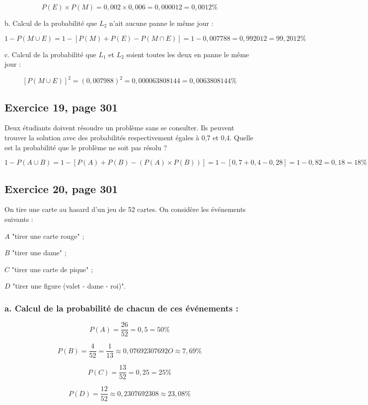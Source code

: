 \documentclass[10pt]{article}
\begin{document}
$$P(E)\times P(M)=0,002\times 0,006=0,000012=0,0012\%$$\vspace{1pt}

b. Calcul de la probabilité que $L_2$ n'ait aucune panne le même jour :

$$1-P(M\cup E)=1-\left[ P(M)+P(E)-P(M\cap E) \right]=1-0,007788=0,992012=99,2012\%$$\vspace{1pt}

c. Calcul de la probabilité que $L_1$ et $L_2$ soient toutes les deux en panne le même jour :

$$[P(M\cup E)]^2=(0,007988)^2=0,000063808144=0,0063808144\%$$

\subsection*{Exercice 19, page 301}
Deux étudiants doivent résoudre un problème sans se consulter. Ils peuvent trouver la solution avec des probabilités respectivement égales à 0,7 et 0,4. Quelle est la probabilité que le problème ne soit pas résolu ?

$$1-P(A\cup B)=1- \left[ P(A)+P(B)-\left( P(A)\times P(B)\right)\right]=1-[0,7+0,4-0,28]=1-0,82=0,18=18\%$$

\subsection*{Exercice 20, page 301}
On tire une carte au hasard d'un jeu de 52 cartes. On considère les événements suivants :\vspace{2pt}

$A$ "tirer une carte rouge" ;

$B$ "tirer une dame" ;

$C$ "tirer une carte de pique" ;

$D$ "tirer une figure (valet - dame - roi)".

\subsubsection*{a. Calcul de la probabilité de chacun de ces événements :}

$$P(A)=\frac{26}{52}=0,5=50\%$$

$$P(B)=\frac{4}{52}=\frac{1}{13}\approx 0,07692307692O\approx 7,69\%$$

$$P(C)=\frac{13}{52}=0,25=25\%$$

$$P(D)=\frac{12}{52}\approx 0,2307692308\approx 23,08\%$$

\newpage
\end{document}
